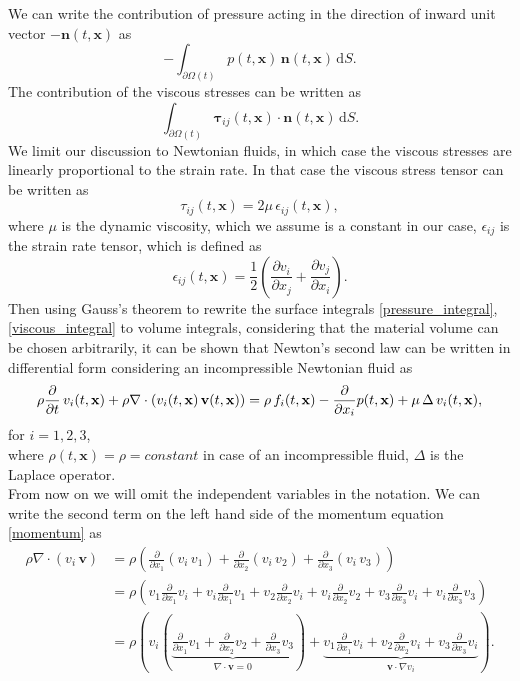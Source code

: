 \documentclass[../include.tex]{subfiles}
\begin{document}
We can write the contribution of pressure acting in the direction of inward unit vector $ - \mathbf{n}(t, \mathbf{x}) $ as
\begin{equation}
	\label{pressure_integral}
	-\int_{\partial \Omega(t)} p(t, \mathbf{x})\, \mathbf{n}(t, \mathbf{x})\,\mathrm{d}S.
\end{equation}
The contribution of the viscous stresses can be written as
\begin{equation}
	\label{viscous_integral}
	\int_{\partial \Omega(t)} \mathbf{\tau}_{ij}(t, \mathbf{x}) \cdot \mathbf{n}(t, \mathbf{x})\,\mathrm{d}S.
\end{equation}
We limit our discussion to Newtonian fluids, in which case the viscous stresses are linearly proportional to the strain rate. In that case the viscous stress tensor can be written as
\[
\tau_{ij}(t, \mathbf{x}) = 2 \mu\, \epsilon_{ij}(t, \mathbf{x}),
\]
where $ \mu $ is the dynamic viscosity, which we assume is a constant in our case, $ \epsilon_{ij} $ is the strain rate tensor, which is defined as
\[
\epsilon_{ij}(t, \mathbf{x}) = \frac{1}{2}\left(\frac{\partial v_i}{\partial x_{j}} + \frac{\partial v_j}{\partial x_{i}} \right).
\]
Then using Gauss's theorem to rewrite the surface integrals \eqref{pressure_integral}, \eqref{viscous_integral} to volume integrals, considering that the material volume can be chosen arbitrarily, it can be shown that Newton's second law can be written in differential form considering an incompressible Newtonian fluid as
\begin{equation}
	\label{momentum}
		\rho \frac{\partial}{\partial t} \,v_i (t, \mathbf{x}) + \rho \nabla \cdot (v_i(t, \mathbf{x})\,\mathbf{v}(t, \mathbf{x})) =\\
		\rho\, f_i(t, \mathbf{x}) - \frac{\partial}{\partial x_i} p(t, \mathbf{x}) +  \mu\,\Delta\, v_i(t, \mathbf{x}),
\end{equation}
\quad for $ i = 1, 2, 3 $, \\
where $ \rho(t, \mathbf{x}) = \rho = constant $ in case of an incompressible fluid, $ \Delta $ is the Laplace operator.\\
From now on we will omit the independent variables in the notation. We can write the second term on the left hand side of the momentum equation \eqref{momentum} as
\begin{equation}
\begin{split}
	\rho \nabla \cdot (v_i\,\mathbf{v}) &= \rho \left(\frac{\partial}{\partial x_1}(v_i\,v_1) + 
	\frac{\partial}{\partial x_2}(v_i\,v_2) + \frac{\partial}{\partial x_3}(v_i\,v_3)\right)\\
	&= \rho \left(v_1 \frac{\partial}{\partial x_1}v_i + v_i\frac{\partial}{\partial x_1}v_{1} +
	 v_2\frac{\partial}{\partial x_2}v_{i} + v_i\frac{\partial}{\partial x_2}v_2 + 
	 v_3\frac{\partial}{\partial x_3}v_{i} + v_i\frac{\partial}{\partial x_3}v_3\right)\\
	&= \rho (v_i(\underbrace{\frac{\partial}{\partial x_1}v_{1} + \frac{\partial}{\partial x_2}v_{2} + \frac{\partial}{\partial x_3}v_{3}}_{\nabla \cdot \mathbf{v} = 0}) + \underbrace{v_1\frac{\partial}{\partial x_1}v_{i} + v_2\frac{\partial}{\partial x_2}v_i + v_3\frac{\partial}{\partial x_3}v_{i}}_{\mathbf{v} \cdot \nabla v_i}).
\end{split}
\end{equation}
\end{document}

